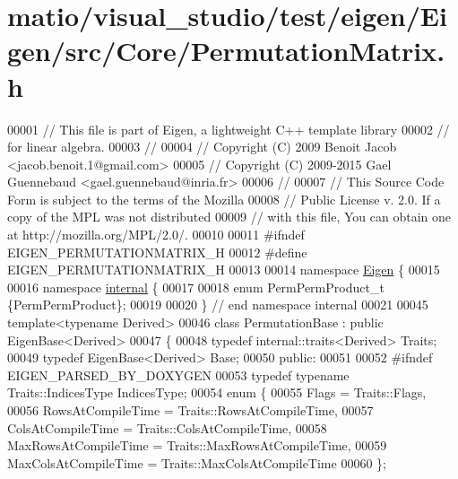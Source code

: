 \hypertarget{matio_2visual__studio_2test_2eigen_2_eigen_2src_2_core_2_permutation_matrix_8h_source}{}\section{matio/visual\+\_\+studio/test/eigen/\+Eigen/src/\+Core/\+Permutation\+Matrix.h}
\label{matio_2visual__studio_2test_2eigen_2_eigen_2src_2_core_2_permutation_matrix_8h_source}

\begin{DoxyCode}
00001 \textcolor{comment}{// This file is part of Eigen, a lightweight C++ template library}
00002 \textcolor{comment}{// for linear algebra.}
00003 \textcolor{comment}{//}
00004 \textcolor{comment}{// Copyright (C) 2009 Benoit Jacob <jacob.benoit.1@gmail.com>}
00005 \textcolor{comment}{// Copyright (C) 2009-2015 Gael Guennebaud <gael.guennebaud@inria.fr>}
00006 \textcolor{comment}{//}
00007 \textcolor{comment}{// This Source Code Form is subject to the terms of the Mozilla}
00008 \textcolor{comment}{// Public License v. 2.0. If a copy of the MPL was not distributed}
00009 \textcolor{comment}{// with this file, You can obtain one at http://mozilla.org/MPL/2.0/.}
00010 
00011 \textcolor{preprocessor}{#ifndef EIGEN\_PERMUTATIONMATRIX\_H}
00012 \textcolor{preprocessor}{#define EIGEN\_PERMUTATIONMATRIX\_H}
00013 
00014 \textcolor{keyword}{namespace }\hyperlink{namespace_eigen}{Eigen} \{ 
00015 
00016 \textcolor{keyword}{namespace }\hyperlink{namespaceinternal}{internal} \{
00017 
00018 \textcolor{keyword}{enum} PermPermProduct\_t \{PermPermProduct\};
00019 
00020 \} \textcolor{comment}{// end namespace internal}
00021 
00045 \textcolor{keyword}{template}<\textcolor{keyword}{typename} Derived>
00046 \textcolor{keyword}{class }PermutationBase : \textcolor{keyword}{public} EigenBase<Derived>
00047 \{
00048     \textcolor{keyword}{typedef} internal::traits<Derived> Traits;
00049     \textcolor{keyword}{typedef} EigenBase<Derived> Base;
00050   \textcolor{keyword}{public}:
00051 
00052 \textcolor{preprocessor}{    #ifndef EIGEN\_PARSED\_BY\_DOXYGEN}
00053     \textcolor{keyword}{typedef} \textcolor{keyword}{typename} Traits::IndicesType IndicesType;
00054     \textcolor{keyword}{enum} \{
00055       Flags = Traits::Flags,
00056       RowsAtCompileTime = Traits::RowsAtCompileTime,
00057       ColsAtCompileTime = Traits::ColsAtCompileTime,
00058       MaxRowsAtCompileTime = Traits::MaxRowsAtCompileTime,
00059       MaxColsAtCompileTime = Traits::MaxColsAtCompileTime
00060     \};

\end{DoxyCode}
